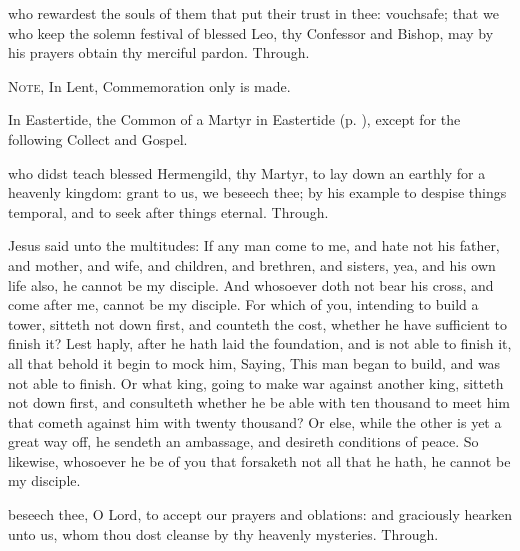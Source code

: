 
\postcommunion
{} who rewardest the souls of them that put their trust in thee: vouchsafe; that we who keep the solemn festival of blessed Leo, thy Confessor and Bishop, may by his prayers obtain thy merciful pardon. Through.


\clearpage
{}

\begin{rubric}
	\textsc{Note,} In Lent, Commemoration only is made.
\end{rubric}

\begin{rubric}
	In Eastertide, the Common of a Martyr in Eastertide (p. \pageref{CommonMartyrEaster}), except for the following Collect and Gospel.
\end{rubric}

\collect
{} who didst teach blessed Hermengild, thy Martyr, to lay down an earthly for a heavenly kingdom: grant to us, we beseech thee; by his example to despise things temporal, and to seek after things eternal. Through.

 Jesus said unto the multitudes: If any man come to me, and hate not his father, and mother, and wife, and children, and brethren, and sisters, yea, and his own life also, he cannot be my disciple. And whosoever doth not bear his cross, and come after me, cannot be my disciple. For which of you, intending to build a tower, sitteth not down first, and counteth the cost, whether he have sufficient to finish it? Lest haply, after he hath laid the foundation, and is not able to finish it, all that behold it begin to mock him, Saying, This man began to build, and was not able to finish. Or what king, going to make war against another king, sitteth not down first, and consulteth whether he be able with ten thousand to meet him that cometh against him with twenty thousand? Or else, while the other is yet a great way off, he sendeth an ambassage, and desireth conditions of peace. So likewise, whosoever he be of you that forsaketh not all that he hath, he cannot be my disciple.

\secret
{} beseech thee, O Lord, to accept our prayers and oblations: and graciously hearken unto us, whom thou dost cleanse by thy heavenly mysteries. Through.

